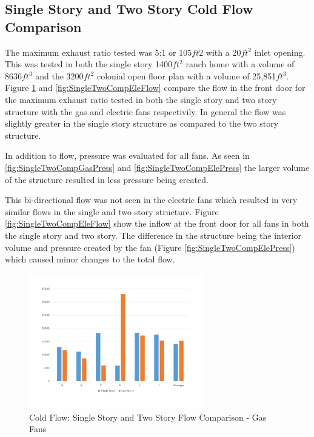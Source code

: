\documentclass{article}
\begin{document}
\subsection{Single Story and Two Story Cold Flow Comparison}

The maximum exhaust ratio tested was 5:1 or 105$ft2$ with a 20$ft^2$ inlet opening. This was tested in both the single story 1400$ft^2$ ranch home with a volume of 8636$ft^3$ and the 3200$ft^2$ colonial open floor plan with a volume of 25,851$ft^3$. Figure \ref{fig:SingleTwoCompGasFlow} and \ref{fig:SingleTwoCompEleFlow} compare the flow in the front door for the maximum exhaust ratio tested in both the single story and two story structure with the gas and electric fans respectivily. In general the flow was slightly greater in the single story structure as compared to the two story structure. 

In addition to flow, pressure was evaluated for all fans. As seen in \ref{fig:SingleTwoCompGasPress} and \ref{fig:SingleTwoCompElePress} the larger volume of the structure resulted in less pressure being created. 

This bi-directional flow was not seen in the electric fans which resulted in very similar flows in the single and two story structure. Figure \ref{fig:SingleTwoCompEleFlow} show the inflow at the front door for all fans in both the single story and two story. The difference in the structure being the interior volume and pressure created by the fan (Figure \ref{fig:SingleTwoCompElePress}) which caused minor changes to the total flow. 

\begin{figure}[H]
	\centering
	\includegraphics[width=3in]{0_Images/ColdFlow/Gas_Flow.pdf}
	\caption{Cold Flow: Single Story and Two Story Flow Comparison - Gas Fans}
	\label{fig:SingleTwoCompGasFlow}
\end{figure}
\end{document}
